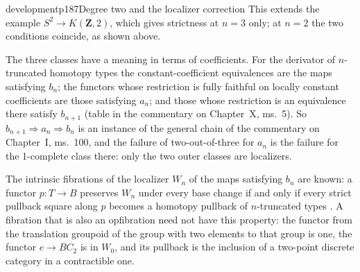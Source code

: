 \begin{dcomment}{development}{p187}{Degree two and the localizer correction}
This extends the example $S^2\to K(\mathbf Z,2)$, which gives strictness at $n=3$ only; at $n=2$ the two conditions coincide, as shown above.

The three classes have a meaning in terms of coefficients. For the derivator of $n$-truncated homotopy types the constant-coefficient equivalences are the maps satisfying $b_n$; the functors whose restriction is fully faithful on locally constant coefficients are those satisfying $a_n$; and those whose restriction is an equivalence there satisfy $b_{n+1}$ (table in the commentary on Chapter~X, ms.~5). So $b_{n+1}\Rightarrow a_n\Rightarrow b_n$ is an instance of the general chain of the commentary on Chapter~I, ms.~100, and the failure of two-out-of-three for $a_n$ is the failure for the 1-complete class there: only the two outer classes are localizers.

The intrinsic fibrations of the localizer $W_n$ of the maps satisfying $b_n$ are known: a functor $p:T\to B$ preserves $W_n$ under every base change if and only if every strict pullback square along $p$ becomes a homotopy pullback of $n$-truncated types \citep[Proposition~6.2.3 and \S9.2]{Cisinski2006}. A fibration that is also an opfibration need not have this property: the functor from the translation groupoid of the group with two elements to that group is one, the functor $e\to BC_2$ is in $W_0$, and its pullback is the inclusion of a two-point discrete category in a contractible one.
\end{dcomment}

